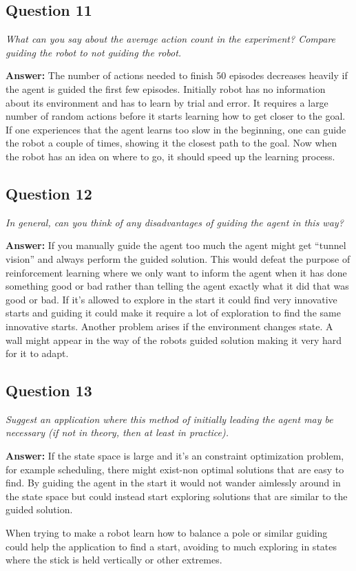 \documentclass[a4paper]{article}
\begin{document}
\subsection*{Question 11}
\emph{What can you say about the average action count in the experiment? Compare guiding the robot to not guiding the robot.}

\textbf{Answer:} 
The number of actions needed to finish 50 episodes decreases heavily if the agent is guided the first few episodes. Initially robot has no information about its environment and has to learn by trial and error. It requires a large number of random actions before it starts learning how to get closer to the goal. If one experiences that the agent learns too slow in the beginning, one can guide the robot a couple of times, showing it the closest path to the goal. Now when the robot has an idea on where to go, it should speed up the learning process. 

\subsection*{Question 12}
\emph{In general, can you think of any disadvantages of guiding the
agent in this way?} 

\textbf{Answer:} If you manually guide the agent too much the agent might get ``tunnel vision'' and always perform the guided solution. This would defeat the purpose of reinforcement learning where we only want to inform the agent when it has done something good or bad rather than telling the agent exactly what it did that was good or bad. If it's allowed to explore in the start it could find very innovative starts and guiding it could make it require a lot of exploration to find the same innovative starts. Another problem arises if the environment changes state. A wall might appear in the way of the robots guided solution making it very hard for it to adapt. 

\subsection*{Question 13}
\emph{Suggest an application where this method of initially leading the
agent may be necessary (if not in theory, then at least in practice).}

\textbf{Answer:} If the state space is large and it's an constraint optimization problem, for example scheduling, there might exist-non optimal solutions that are easy to find. By guiding the agent in the start it would not wander aimlessly around in the state space but could instead start exploring solutions that are similar to the guided solution. 

When trying to make a robot learn how to balance a pole or similar guiding could help the application to find a start, avoiding to much exploring in states where the stick is held vertically or other extremes.
\end{document}
